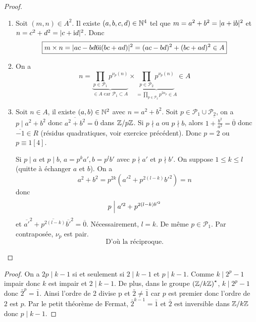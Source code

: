 \documentclass[12pt]{article}
\begin{document}
\begin{proof}
	\phantom{}
	\begin{enumerate}
		\item Soit $(m,n)\in A^{2}$. Il existe $(a,b,c,d)\in\mathbb{N}^{4}$ tel que $m=a^{2}+b^{2}=\vert a+\mathrm{i} b\vert^{2}$ et $n=c^{2}+d^{2}=\vert c+\mathrm{i} d\vert^{2}$. Donc 
		\begin{equation}
			\boxed{m\times n=\vert ac-bd6\mathrm{i}(bc+ad)\vert^{2}=(ac-bd)^{2}+(bc+ad)^{2}\in A}
		\end{equation}
		\item On a 
		\begin{equation}
			\boxed{n=\underbrace{\prod_{p\in\mathcal{P}_{1}}p^{\nu_{p}(n)}}_{\in A\text{ car }\mathcal{P}_{1}\subset A}\times\underbrace{\prod_{p\in\mathcal{P}_{2}}p^{\nu_{p}(n)}}_{=\prod_{p\in\mathcal{P}_{2}}p^{2\alpha_{p}}\in A}\in A}
		\end{equation}

		\item Soit $n\in A$, il existe $(a,b)\in\mathbb{N}^{2}$ avec $n=a^{2}+b^{2}$. Soit $p\in \mathcal{P}_{1}\cup\mathcal{P}_{2}$, on a $p\mid a^{2}+b^{2}$ donc $\overline{a^{2}+b^{2}}=\overline{0}$ dans $\mathbb{Z}/p\mathbb{Z}$. Si $p\nmid a$ ou $p\nmid b$, alors $\overline{1+\frac{b^{2}}{a^{2}}}=\overline{0}$ donc $\overline{-1}\in R$ (résidus quadratiques, voir exercice précédent). Donc $p=2$ ou $p\equiv 1[4]$.
		
		Si $p\mid a$ et $p\mid b$, $a=p^{k}a', b=p^{l}b'$ avec $p\nmid a'$ et $p\nmid b'$. On suppose $1\leqslant k\leqslant l$ (quitte à échanger $a$ et $b$).
		On a 
		\begin{equation}
			a^{2}+b^{2}=p^{2k}(a'^{2}+p^{2(l-k)}b'^{2})=n
		\end{equation}
		donc 
		\begin{equation}
			p\Bigm| a'^{2}+p^{2(l-k)b'^{2}}
		\end{equation}
		et $\overline{a'}^{2}+\overline{p^{2(l-k)}}\overline{b'}^{2}=\overline{0}$. Nécessairement, $l=k$. De même $p\in\mathcal{P}_{1}$. Par contraposée, $\nu_{p}$ est pair.
		\begin{equation}
			\boxed{\text{D'où la réciproque.}}
		\end{equation}
	\end{enumerate}
\end{proof}

\begin{proof}
	On a $2p\mid k-1$ si et seulement si $2\mid k-1$ et $p\mid k-1$. Comme $k\mid2^{p}-1$ impair donc $k$ est impair et $2\mid k-1$. De plus, dans le groupe $\left(\mathbb{Z}/k\mathbb{Z}\right)^{\star}$, $k\mid 2^{p}-1$ donc $\bar{2}^{p}=\bar{1}$. Ainsi l'ordre de 2 divise p et $\bar{2}\neq\bar{1}$ car $p$ est premier donc l'ordre de $2$ est $p$. Par le petit théorème de Fermat, $\bar{2}^{k-1}=\bar{1}$ et $\bar{2}$ est inversible dans $\mathbb{Z}/k\mathbb{Z}$ donc $p\mid k-1$.
\end{proof}
\end{document}
